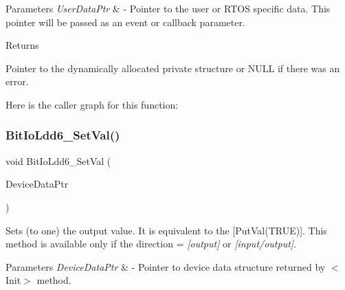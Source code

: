 \begin{DoxyParams}{Parameters}
{\em User\+Data\+Ptr} & -\/ Pointer to the user or R\+T\+OS specific data. This pointer will be passed as an event or callback parameter. \\
\hline
\end{DoxyParams}
\begin{DoxyReturn}{Returns}

\begin{DoxyItemize}
\item Pointer to the dynamically allocated private structure or N\+U\+LL if there was an error. 
\end{DoxyItemize}
\end{DoxyReturn}
Here is the caller graph for this function\+:
\mbox{\label{group___bit_io_ldd6__module_ga349b97d02eb4a3fd7be6930aa55d08cc}} 
\subsubsection{\texorpdfstring{Bit\+Io\+Ldd6\+\_\+\+Set\+Val()}{BitIoLdd6\_SetVal()}}
{\footnotesize\ttfamily void Bit\+Io\+Ldd6\+\_\+\+Set\+Val (\begin{DoxyParamCaption}\item[{\hyperlink{group___p_e___types__module_gac5cf1362f1f0e3a2ce71b1bf2276d091}{L\+D\+D\+\_\+\+T\+Device\+Data} $\ast$}]{Device\+Data\+Ptr }\end{DoxyParamCaption})}



Sets (to one) the output value. It is equivalent to the \mbox{[}Put\+Val(\+T\+R\+U\+E)\mbox{]}. This method is available only if the direction = {\itshape \mbox{[}output\mbox{]}} or {\itshape \mbox{[}input/output\mbox{]}}. 


\begin{DoxyParams}{Parameters}
{\em Device\+Data\+Ptr} & -\/ Pointer to device data structure returned by $<$\+Init$>$ method. \\
\hline
\end{DoxyParams}
